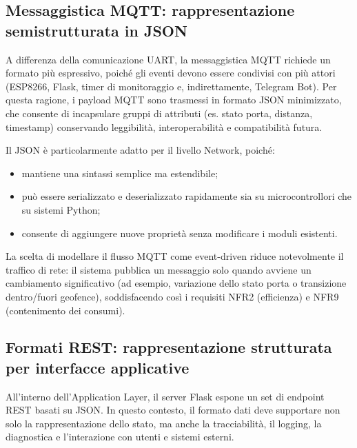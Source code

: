 \subsection*{Messaggistica
MQTT: rappresentazione semistrutturata in JSON}

A differenza
della comunicazione UART, la messaggistica MQTT richiede un formato
più espressivo, poiché gli eventi devono essere condivisi con più
attori (ESP8266, Flask, timer di monitoraggio e, indirettamente,
Telegram Bot). Per questa ragione, i payload MQTT sono trasmessi in
formato JSON minimizzato, che consente di incapsulare gruppi di
attributi (es. stato porta, distanza, timestamp) conservando
leggibilità, interoperabilità e compatibilità futura.



Il
JSON è particolarmente adatto per il livello Network,
poiché:

\begin{itemize}


   \item
mantiene
una sintassi semplice ma estendibile;

    \item
può
essere serializzato e deserializzato rapidamente sia su
microcontrollori che su sistemi Python;

    \item
consente
di aggiungere nuove proprietà senza modificare i moduli
esistenti.

\end{itemize}



La
scelta di modellare il flusso MQTT come event-driven riduce
notevolmente il traffico di rete: il sistema pubblica un messaggio
solo quando avviene un cambiamento significativo (ad esempio,
variazione dello stato porta o transizione dentro/fuori geofence),
soddisfacendo così i requisiti NFR2 (efficienza) e NFR9
(contenimento dei consumi).



\subsection*{Formati
REST: rappresentazione strutturata per interfacce
applicative}

All’interno dell’Application Layer, il server
Flask espone un set di endpoint REST basati su JSON. In questo
contesto, il formato dati deve supportare non solo la
rappresentazione dello stato, ma anche la tracciabilità, il logging,
la diagnostica e l’interazione con utenti e sistemi
esterni.

